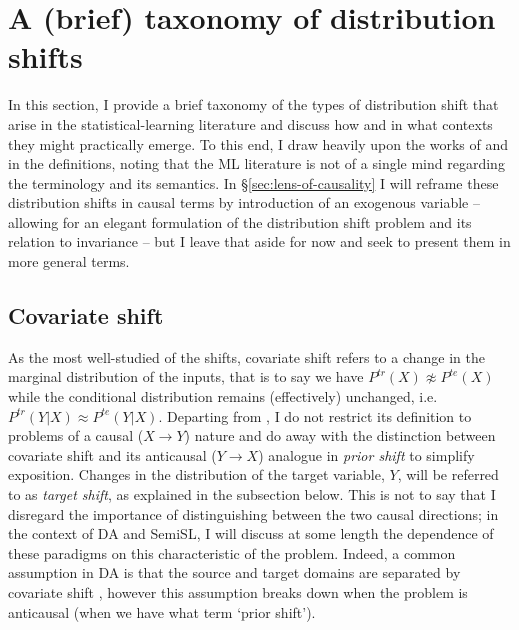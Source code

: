 \section{A (brief) taxonomy of distribution shifts}\label{sec:dist-shift}
In this section, I provide a brief taxonomy of the types of distribution shift that arise in the
statistical-learning literature and discuss how and in what contexts they might practically emerge.
%
To this end, I draw heavily upon the works of \citet{moreno2012unifying} and
\citet{castro2020causality} in the definitions, noting that the \ac{ML} literature is not of a
single mind regarding the terminology and its semantics.
%
In \S\ref{sec:lens-of-causality} I will reframe these distribution shifts in causal terms by
introduction of an exogenous variable -- allowing for an elegant formulation of the distribution
shift problem and its relation to invariance -- but I leave that aside for now and seek to present
them in more general terms.
\subsection{Covariate shift}\label{ssec:covariate-shift}
As the most well-studied of the shifts, covariate shift refers to a change in the marginal
distribution of the inputs, that is to say we have \( P^{tr}(X) \not\approx P^{te}(X) \) while the
conditional distribution remains (effectively) unchanged, i.e.\ \( P^{tr}(Y|X) \approx P^{te}(Y|X)
\).
%
Departing from \citet{moreno2012unifying}, I do not restrict its definition to problems of a causal
(\( X \to Y\)) nature and do away with the distinction between covariate shift and its anticausal
(\( Y \to X \)) analogue in \emph{prior shift} to simplify exposition.
%
Changes in the distribution of the target variable, \(Y\), will be referred to as \emph{target
shift}, as explained in the subsection below.
%
This is not to say that I disregard the importance of distinguishing between the two causal
directions; in the context of \ac{DA} and \ac{SemiSL}, I will discuss at some length the dependence of these
paradigms on this characteristic of the problem.
%
Indeed, a common assumption in \ac{DA} is that the source and target domains are separated by
covariate shift \citep{david2010impossibility}, however this assumption breaks down when the
problem is anticausal (when we have what \citet{moreno2012unifying} term `prior shift').

